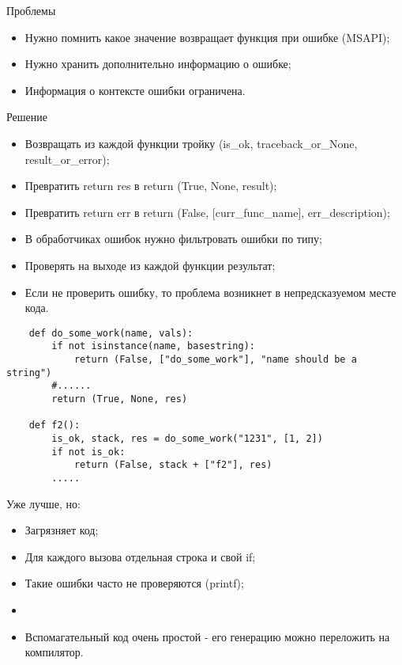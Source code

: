 \documentclass{article}
\begin{document}
\begin{center} Проблемы \end{center}
\begin{itemize}
	\item Нужно помнить какое значение возвращает функция при ошибке (MSAPI);
	\item Нужно хранить дополнительно информацию о ошибке;
	\item Информация о контексте ошибки ограничена.
\end{itemize}
\newpage

\begin{center} Решение \end{center}
\begin{itemize}
	\item Возвращать из каждой функции тройку (is\_ok, traceback\_or\_None, result\_or\_error);
	\item Превратить return res в return (True, None, result);
	\item Превратить return err в return (False, [curr\_func\_name], err\_description);
	\item В обработчиках ошибок нужно фильтровать ошибки по типу;
	\item Проверять на выходе из каждой функции результат;
	\item Если не проверить ошибку, то проблема 
			возникнет в непредсказуемом месте кода.
\end{itemize}
\newpage

\begin{lstlisting}
	def do_some_work(name, vals):
		if not isinstance(name, basestring):
			return (False, ["do_some_work"], "name should be a string")
		#......
		return (True, None, res)

	def f2():
		is_ok, stack, res = do_some_work("1231", [1, 2])
		if not is_ok:
			return (False, stack + ["f2"], res)
		.....
\end{lstlisting}
\newpage

\begin{center}Уже лучше, но:\end{center}
\begin{itemize}
	\item Загрязняет код;
	\item Для каждого вызова отдельная строка и свой if;
	\item Такие ошибки часто не проверяются (printf);
	\item
	\item Вспомагательный код очень простой - его 
		  генерацию можно переложить на компилятор.
\end{itemize}
\newpage
\end{document}
